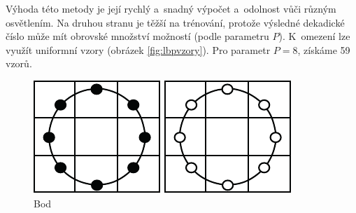 Výhoda této metody je její rychlý a~snadný výpočet a~odolnost vůči různým osvětlením. Na druhou stranu je těžší na trénování, protože výsledné dekadické číslo může mít obrovské množství možností (podle parametru $P$). K~omezení lze využít uniformní vzory (obrázek \ref{fig:lbpvzory}). Pro parametr $P=8$, získáme 59 vzorů. 

\begin{figure}[H]
\centering
\begin{minipage}[b]{.18\textwidth}
  \centering
  \includegraphics[width=.9\linewidth]{figures/lbp_spot}
  \caption*{Bod}
\end{minipage}
\begin{minipage}[b]{.18\textwidth}
  \centering
  \includegraphics[width=.9\linewidth]{figures/lbp_spot_flat}

\end{minipage}
\end{figure}
